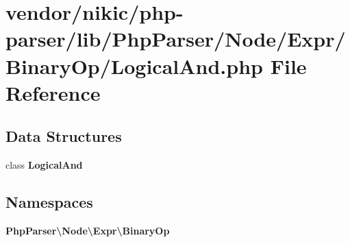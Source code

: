 \section{vendor/nikic/php-\/parser/lib/\+Php\+Parser/\+Node/\+Expr/\+Binary\+Op/\+Logical\+And.php File Reference}
\label{_logical_and_8php}
\subsection*{Data Structures}
\begin{DoxyCompactItemize}
\item 
class {\bf Logical\+And}
\end{DoxyCompactItemize}
\subsection*{Namespaces}
\begin{DoxyCompactItemize}
\item 
 {\bf Php\+Parser\textbackslash{}\+Node\textbackslash{}\+Expr\textbackslash{}\+Binary\+Op}
\end{DoxyCompactItemize}
